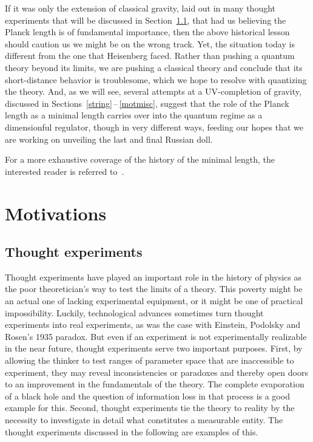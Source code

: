 \documentclass{article}
\begin{document}
If it was only the extension of classical gravity, laid out in many thought experiments 
that will be discussed in Section~\ref{thought}, that had us believing the Planck length 
is of fundamental importance, then the above historical lesson should caution us we might 
be on the wrong track. Yet, the situation today is different from the one that Heisenberg 
faced. Rather than pushing a quantum theory beyond its limits, we are pushing a classical 
theory and conclude that its short-distance behavior is troublesome, which we hope to 
resolve with quantizing the theory. And, as we will see, several attempts at a 
UV-completion of gravity, discussed in Sections~\ref{string}\,--\,\ref{motmisc}, 
suggest that the role of the Planck length as a minimal length carries over into 
the quantum regime as a dimensionful regulator, though in very different ways, feeding our hopes
that we are working on unveiling the last and final Russian doll. 

For a more exhaustive coverage of the history of the minimal length, the interested
reader is referred to~\cite{Hagar:LM}.

\newpage

\section{Motivations}
\label{motivations}

\subsection{Thought experiments}
\label{thought}

Thought experiments have played an important role in the history of physics as the poor theoretician's way to 
test the limits of a theory. This poverty might be an actual one of lacking experimental equipment, or it
might be one of practical impossibility. Luckily, technological advances sometimes turn thought experiments
into real experiments, as was the case with Einstein, Podolsky and Rosen's 1935 paradox. But even if
an experiment is not experimentally realizable in the near future, thought
experiments serve two important purposes. First, by allowing the thinker to test ranges of parameter space
that are inaccessible to experiment, they may reveal inconsistencies or paradoxes and thereby open doors to
an improvement in the fundamentals of the theory. The complete evaporation of a black hole and the question of
information loss in that process is a good example for this. Second, thought experiments tie the theory 
to reality by the necessity to investigate in detail what constitutes a measurable entity. The thought 
experiments discussed in the following are examples of this. 
\end{document}
